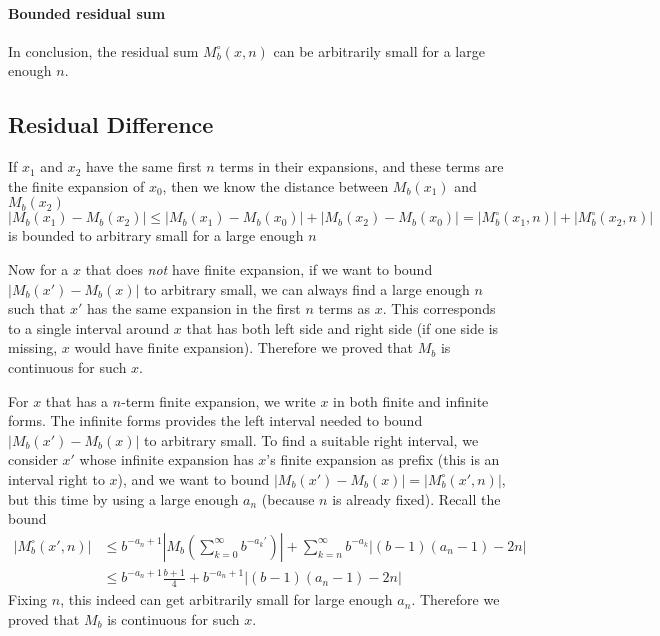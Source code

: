 \documentclass[]{article}
\begin{document}
\paragraph{Bounded residual sum} In conclusion, the residual sum $M_b^{\circ}(x, n)$ can be arbitrarily small for a large enough $n$. 


\subsection{Residual Difference}
If $x_1$ and $x_2$ have the same first $n$ terms in their expansions, and these terms are the finite expansion of $x_0$, then we know the distance between $M_b(x_1)$ and $M_b(x_2)$
\[
|M_b(x_1) - M_b(x_2)| \le |M_b(x_1) - M_b(x_0)| + |M_b(x_2) - M_b(x_0)| = |M_b^\circ(x_1, n)| + |M_b^\circ(x_2, n)| 
\]
is bounded to arbitrary small for a large enough $n$

Now for a $x$ that does \textit{not} have finite expansion, if we want to bound $|M_b(x') - M_b(x)|$ to arbitrary small, we can always find a large enough $n$ such that $x'$ has the same expansion in the first $n$ terms as $x$. This corresponds to a single interval around $x$ that has both left side and right side (if one side is missing, $x$ would have finite expansion). Therefore we proved that $M_b$ is continuous for such $x$.

For $x$ that has a $n$-term finite expansion, we write $x$ in both finite and infinite forms. The infinite forms provides the left interval needed to bound $|M_b(x') - M_b(x)|$ to arbitrary small. To find a suitable right interval, we consider $x'$ whose infinite expansion has $x$'s finite expansion as prefix (this is an interval right to $x$), and we want to bound $|M_b(x') - M_b(x)| = |M_b^\circ(x', n)|$, but this time by using a large enough $a_n$ (because $n$ is already fixed). Recall the bound 
\begin{align*}
|M_b^\circ(x', n)| &\le  b^{-a_{n}+1}\left|M_b\left(\sum_{k=0}^\infty b^{-a_k'}\right)\right| + \sum_{k=n}^\infty b^{-a_k}\Big|(b-1)(a_{n}-1)-2n\Big|\\
&\le b^{-a_{n}+1}\frac{b+1}{4} + b^{-a_{n}+1}|(b-1)(a_{n}-1)-2n|
\end{align*}
Fixing $n$, this indeed can get arbitrarily small for large enough $a_n$. Therefore we proved that $M_b$ is continuous for such $x$.
\end{document}
